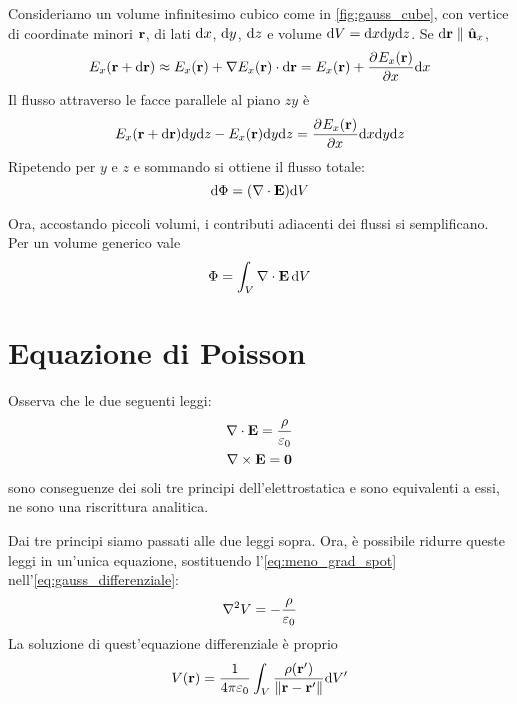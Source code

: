 
Consideriamo un volume infinitesimo cubico come in \cref{fig:gauss_cube}, con vertice di coordinate minori $\mathbf{r}$, di lati $\mathrm{d} x$, $\mathrm{d} y$, $\mathrm{d} z$ e volume $\mathrm{d} V = \mathrm{d} x \mathrm{d} y \mathrm{d} z$.
Se $\mathrm{d} \mathbf{r} \parallel \hat{\mathbf{u}}_{x}$,
\begin{equation}
    E_x(\p + \de \p) \approx E_x(\p) + \grad E_x(\p) \cdot \de \p = E_x(\p) + \parder[E_x(\p)]{x} \de x
\end{equation}
Il flusso attraverso le facce parallele al piano $zy$ è
\begin{equation}
    E_x(\p + \de \p) \de y \de z - E_x(\p) \de y \de z = \parder[E_x(\p)]{x} \de x \de y \de z
\end{equation}
Ripetendo per $y$ e $z$ e sommando si ottiene il flusso totale:
\begin{equation}
    \mathrm{d} \Phi = (\nabla \cdot \mathbf{E}) \mathrm{d} V
\end{equation}

Ora, accostando piccoli volumi, i contributi adiacenti dei flussi si semplificano. Per un volume generico vale
\begin{equation}
    \Phi = \int_V \nabla \cdot \mathbf{E} \, \mathrm{d} V
\end{equation}

\section{Equazione di Poisson}

Osserva che le due seguenti leggi:
\begin{gather}
\label{eq:gauss_differenziale}
    \nabla \cdot \mathbf{E} = \frac{\rho}{\varepsilon_0} \\
    \nabla \times \mathbf{E} = \mathbf{0}
\end{gather}
sono conseguenze dei soli tre principi dell'elettrostatica e sono equivalenti a essi, ne sono una riscrittura analitica.

Dai tre principi siamo passati alle due leggi sopra.
Ora, è possibile ridurre queste leggi in un'unica equazione, sostituendo l'\cref{eq:meno_grad_spot} nell'\cref{eq:gauss_differenziale}:
\begin{equation}
    \nabla^2 V = - \frac{\rho}{\varepsilon_0}
\end{equation}
La soluzione di quest'equazione differenziale è proprio
\begin{equation}
    V(\mathbf{r}) = \frac{1}{4\pi \varepsilon_0} \int_V \frac{\rho(\mathbf{r}')}{\left\lVert \mathbf{r} - \mathbf{r}' \right\rVert} \mathrm{d} V'
\end{equation}

